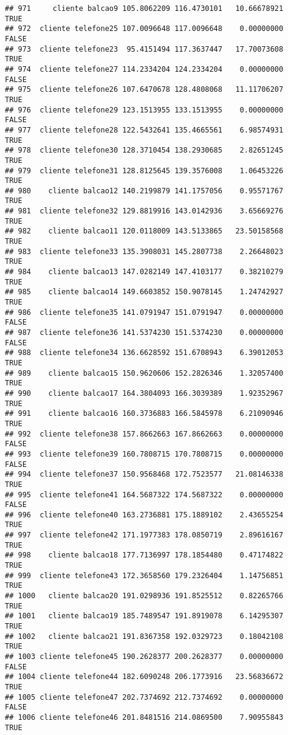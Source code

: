 \documentclass[
]{article}
\begin{document}
\begin{verbatim}
## 971     cliente balcao9 105.8062209 116.4730101   10.66678921     TRUE
## 972  cliente telefone25 107.0096648 117.0096648    0.00000000    FALSE
## 973  cliente telefone23  95.4151494 117.3637447   17.70073608     TRUE
## 974  cliente telefone27 114.2334204 124.2334204    0.00000000    FALSE
## 975  cliente telefone26 107.6470678 128.4808068   11.11706207     TRUE
## 976  cliente telefone29 123.1513955 133.1513955    0.00000000    FALSE
## 977  cliente telefone28 122.5432641 135.4665561    6.98574931     TRUE
## 978  cliente telefone30 128.3710454 138.2930685    2.82651245     TRUE
## 979  cliente telefone31 128.8125645 139.3576008    1.06453226     TRUE
## 980    cliente balcao12 140.2199879 141.1757056    0.95571767     TRUE
## 981  cliente telefone32 129.8819916 143.0142936    3.65669276     TRUE
## 982    cliente balcao11 120.0118009 143.5133865   23.50158568     TRUE
## 983  cliente telefone33 135.3908031 145.2807738    2.26648023     TRUE
## 984    cliente balcao13 147.0282149 147.4103177    0.38210279     TRUE
## 985    cliente balcao14 149.6603852 150.9078145    1.24742927     TRUE
## 986  cliente telefone35 141.0791947 151.0791947    0.00000000    FALSE
## 987  cliente telefone36 141.5374230 151.5374230    0.00000000    FALSE
## 988  cliente telefone34 136.6628592 151.6708943    6.39012053     TRUE
## 989    cliente balcao15 150.9620606 152.2826346    1.32057400     TRUE
## 990    cliente balcao17 164.3804093 166.3039389    1.92352967     TRUE
## 991    cliente balcao16 160.3736883 166.5845978    6.21090946     TRUE
## 992  cliente telefone38 157.8662663 167.8662663    0.00000000    FALSE
## 993  cliente telefone39 160.7808715 170.7808715    0.00000000    FALSE
## 994  cliente telefone37 150.9568468 172.7523577   21.08146338     TRUE
## 995  cliente telefone41 164.5687322 174.5687322    0.00000000    FALSE
## 996  cliente telefone40 163.2736881 175.1889102    2.43655254     TRUE
## 997  cliente telefone42 171.1977383 178.0850719    2.89616167     TRUE
## 998    cliente balcao18 177.7136997 178.1854480    0.47174822     TRUE
## 999  cliente telefone43 172.3658560 179.2326404    1.14756851     TRUE
## 1000   cliente balcao20 191.0298936 191.8525512    0.82265766     TRUE
## 1001   cliente balcao19 185.7489547 191.8919078    6.14295307     TRUE
## 1002   cliente balcao21 191.8367358 192.0329723    0.18042108     TRUE
## 1003 cliente telefone45 190.2628377 200.2628377    0.00000000    FALSE
## 1004 cliente telefone44 182.6090248 206.1773916   23.56836672     TRUE
## 1005 cliente telefone47 202.7374692 212.7374692    0.00000000    FALSE
## 1006 cliente telefone46 201.8481516 214.0869500    7.90955843     TRUE

\end{verbatim}
\end{document}
